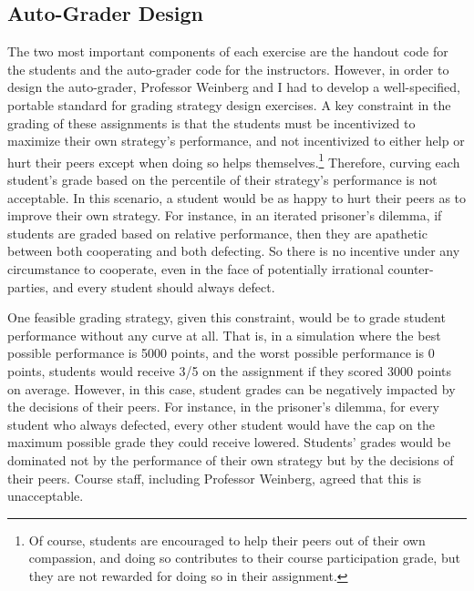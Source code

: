 \documentclass[pageno]{jpaper}
\begin{document}
\subsection*{Auto-Grader Design}
The two most important components of each exercise are the handout code for the students and the auto-grader code for the instructors.
However, in order to design the auto-grader, Professor Weinberg and I had to develop a well-specified, portable standard for grading strategy design exercises.
A key constraint in the grading of these assignments is that the students must be incentivized to maximize their own strategy's performance, and not incentivized to either help or hurt their peers except when doing so helps themselves.\footnote{Of course, students are encouraged to help their peers out of their own compassion, and doing so contributes to their course participation grade, but they are not rewarded for doing so in their assignment.}
Therefore, curving each student's grade based on the percentile of their strategy's performance is not acceptable.
In this scenario, a student would be as happy to hurt their peers as to improve their own strategy.
For instance, in an iterated prisoner's dilemma, if students are graded based on relative performance, then they are apathetic between both cooperating and both defecting.
So there is no incentive under any circumstance to cooperate, even in the face of potentially irrational counter-parties, and every student should always defect.

One feasible grading strategy, given this constraint, would be to grade student performance without any curve at all.
That is, in a simulation where the best possible performance is 5000 points, and the worst possible performance is 0 points, students would receive 3/5 on the assignment if they scored 3000 points on average.
However, in this case, student grades can be negatively impacted by the decisions of their peers.
For instance, in the prisoner's dilemma, for every student who always defected, every other student would have the cap on the maximum possible grade they could receive lowered.
Students' grades would be dominated not by the performance of their own strategy but by the decisions of their peers.
Course staff, including Professor Weinberg, agreed that this is unacceptable.
\end{document}
